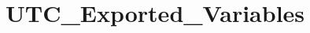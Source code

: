 \hypertarget{group___u_t_c___exported___variables}{}\section{U\+T\+C\+\_\+\+Exported\+\_\+\+Variables}
\label{group___u_t_c___exported___variables}
